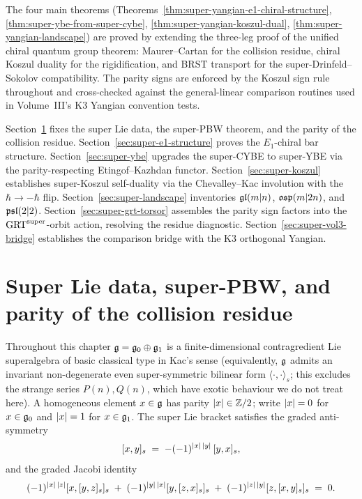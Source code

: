 The four main theorems
(Theorems~\ref{thm:super-yangian-e1-chiral-structure},
\ref{thm:super-ybe-from-super-cybe},
\ref{thm:super-yangian-koszul-dual},
\ref{thm:super-yangian-landscape}) are proved by extending the three-leg
proof of the unified chiral quantum group theorem: Maurer--Cartan for
the collision residue, chiral Koszul duality for the rigidification, and
BRST transport for the super-Drinfeld--Sokolov compatibility. The
parity signs are enforced by the Koszul sign rule throughout and
cross-checked against the general-linear comparison routines used in
Volume~III's K3 Yangian convention tests.

Section~\ref{sec:super-setup} fixes the super Lie data, the
super-PBW theorem, and the parity of the collision residue.
Section~\ref{sec:super-e1-structure} proves the $E_1$-chiral bar
structure. Section~\ref{sec:super-ybe} upgrades the super-CYBE to
super-YBE via the parity-respecting Etingof--Kazhdan functor.
Section~\ref{sec:super-koszul} establishes super-Koszul self-duality via
the Chevalley--Kac involution with the $\hbar\to-\hbar$ flip.
Section~\ref{sec:super-landscape} inventories $\mathfrak{gl}(m|n)$,
$\mathfrak{osp}(m|2n)$, and $\mathfrak{psl}(2|2)$. Section~\ref{sec:super-grt-torsor}
assembles the parity sign factors into the $\mathrm{GRT}^{\mathrm{super}}$-orbit action,
resolving the residue diagnostic.
Section~\ref{sec:super-vol3-bridge} establishes the
comparison bridge with the K3 orthogonal Yangian.

\section{Super Lie data, super-PBW, and parity of the collision residue}
\label{sec:super-setup}

Throughout this chapter
$\mathfrak{g} = \mathfrak{g}_0\oplus\mathfrak{g}_1$ is a finite-dimensional contragredient Lie
superalgebra of basic classical type in Kac's sense (equivalently, $\mathfrak{g}$
admits an invariant non-degenerate even super-symmetric bilinear form
$\langle\cdot,\cdot\rangle_s$; this excludes the strange series
$P(n), Q(n)$, which have exotic behaviour we do not treat here). A
homogeneous element $x\in\mathfrak{g}$ has parity $|x|\in\mathbb{Z}/2$;
write $|x|=0$ for $x\in\mathfrak{g}_0$ and $|x|=1$ for
$x\in\mathfrak{g}_1$. The super Lie bracket satisfies the graded
anti-symmetry
\[
 [x,y]_s \;=\; -(-1)^{|x|\,|y|}\,[y,x]_s,
\]
and the graded Jacobi identity
\begin{equation}
 \label{eq:graded-jacobi}
 (-1)^{|x|\,|z|}[x,[y,z]_s]_s
 \;+\;(-1)^{|y|\,|x|}[y,[z,x]_s]_s
 \;+\;(-1)^{|z|\,|y|}[z,[x,y]_s]_s \;=\; 0.
\end{equation}


